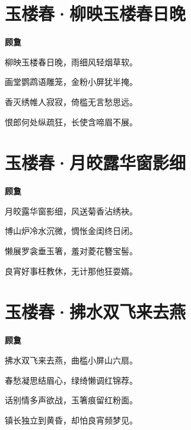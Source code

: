 \documentclass[12pt,a4paper]{ctexbook}
\begin{document}
\section{玉楼春·柳映玉楼春日晚}
\textbf{顾敻}\par\vspace{0.5em}
柳映玉楼春日晚，雨细风轻烟草软。\par
画堂鹦鹉语雕笼，金粉小屏犹半掩。\par
香灭绣帷人寂寂，倚槛无言愁思远。\par
恨郎何处纵疏狂，长使含啼眉不展。\par

\section{玉楼春·月皎露华窗影细}
\textbf{顾敻}\par\vspace{0.5em}
月皎露华窗影细，风送菊香沾绣袂。\par
博山炉冷水沉微，惆怅金闺终日闭。\par
懒展罗衾垂玉箸，羞对菱花簪宝髻。\par
良宵好事枉教休，无计那他狂耍婿。\par

\section{玉楼春·拂水双飞来去燕}
\textbf{顾敻}\par\vspace{0.5em}
拂水双飞来去燕，曲槛小屏山六扇。\par
春愁凝思结眉心，绿绮懒调红锦荐。\par
话别情多声欲战，玉箸痕留红粉面。\par
镇长独立到黄昏，却怕良宵频梦见。\par
\end{document}
